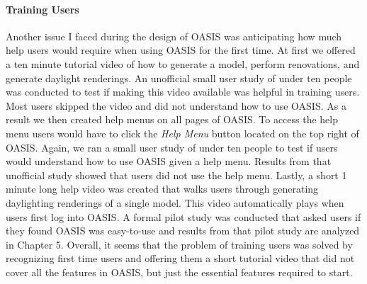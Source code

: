 \paragraph{Training Users}
Another issue I faced during the design of OASIS was anticipating how much help users would require when using OASIS for the first time. At first we offered a ten minute tutorial video of how to generate a model, perform renovations, and generate daylight renderings. An unofficial small user study of under ten people was conducted to test if making this video available was helpful in training users. Most users skipped the video and did not understand how to use OASIS. As a result we then created help menus on all pages of OASIS. To access the help menu users would have to click the \textit{Help Menu} button located on the top right of OASIS. Again, we ran a small user study of under ten people to test if users would understand how to use OASIS given a help menu.  Results from that unofficial study showed that users did not use the help menu.  Lastly, a short 1 minute long help video was created that walks users through generating daylighting renderings of a single model. This video automatically plays when users first log into OASIS.  A formal pilot study was conducted that asked users if they found OASIS was easy-to-use and results from that pilot study are analyzed in Chapter 5. Overall, it seems that the problem of training users was solved by recognizing first time users and offering them a short tutorial video that did not cover all the features in OASIS, but just the essential features required to start.  \\

